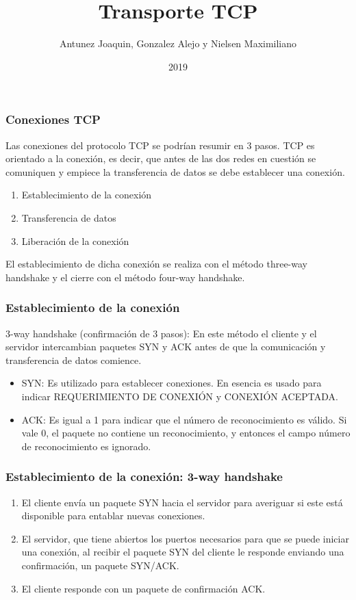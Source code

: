 \documentclass{beamer}
\title{Transporte TCP}
\author{Antunez Joaquin, Gonzalez Alejo y Nielsen Maximiliano}
\institute{Instituto Politécnico Superior Gral. San Martín}
\date{2019}
\begin{document}
 
\frame{\titlepage}
 
\begin{frame}
\frametitle{Conexiones TCP}
Las conexiones del protocolo TCP se podrían resumir en 3 pasos.
TCP es orientado a la conexión, es decir, que antes de las dos redes en cuestión se comuniquen y empiece la transferencia de datos se debe establecer una conexión.
\vspace{5mm}
\begin{enumerate}
\item Establecimiento de la conexión
\item Transferencia de datos
\item Liberación de la conexión
\end{enumerate}

\vspace{5mm}

El establecimiento de dicha conexión se realiza con el método three-way handshake y el cierre con el método four-way handshake.

\end{frame}

\begin{frame}
\frametitle{Establecimiento de la conexión}
3-way handshake (confirmación de 3 pasos): En este método el cliente y el servidor intercambian paquetes SYN y ACK antes de que la comunicación y transferencia de datos comience.
\vspace{5mm}
\begin{itemize}
\item SYN: Es utilizado para establecer conexiones. En esencia es usado para indicar REQUERIMIENTO DE CONEXIÓN y CONEXIÓN ACEPTADA.
\item ACK: Es igual a 1 para indicar que el número de reconocimiento es válido. Si vale 0, el paquete no contiene un reconocimiento, y entonces el campo número de reconocimiento es ignorado.
\end{itemize}
\end{frame}

\begin{frame}
\frametitle{Establecimiento de la conexión: 3-way handshake}
\begin{enumerate}
\item El cliente envía un paquete SYN hacia el servidor para averiguar si este está disponible para entablar nuevas conexiones.
\item El servidor, que tiene abiertos los puertos necesarios para que se puede iniciar una conexión, al recibir el paquete SYN del cliente le responde enviando una confirmación, un paquete SYN/ACK.
\item El cliente responde con un paquete de confirmación ACK.
\end{enumerate}
\end{frame}
\end{document}

